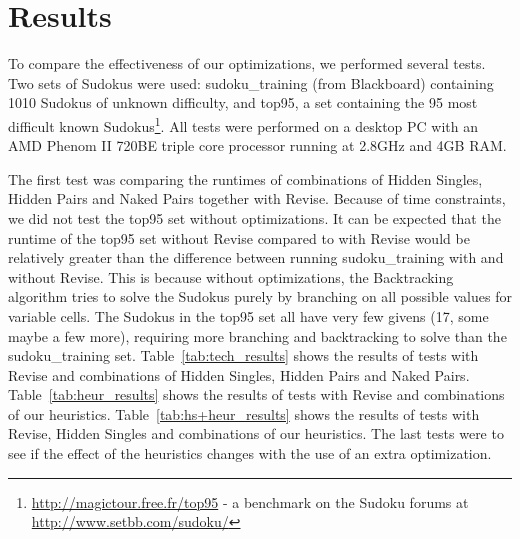 \documentclass[11pt]{article} %
\begin{document}
\section{Results}

To compare the effectiveness of our optimizations, we performed several tests. Two sets of Sudokus were used: sudoku\_training (from Blackboard) containing 1010 Sudokus of unknown difficulty, and top95, a set containing the 95 most difficult known Sudokus\footnote{\url{http://magictour.free.fr/top95} - a benchmark on the Sudoku forums at \url{http://www.setbb.com/sudoku/}}. All tests were performed on a desktop PC with an AMD Phenom II 720BE triple core processor running at 2.8GHz and 4GB RAM.

The first test was comparing the runtimes of combinations of Hidden Singles, Hidden Pairs and Naked Pairs together with Revise. Because of time constraints, we did not test the top95 set without optimizations. It can be expected that the runtime of the top95 set without Revise compared to with Revise would be relatively greater than the difference between running sudoku\_training with and without Revise. This is because without optimizations, the Backtracking algorithm tries to solve the Sudokus purely by branching on all possible values for variable cells. The Sudokus in the top95 set all have very few givens (17, some maybe a few more), requiring more branching and backtracking to solve than the sudoku\_training set.
Table~\ref{tab:tech_results} shows the results of tests with Revise and combinations of Hidden Singles, Hidden Pairs and Naked Pairs. Table~\ref{tab:heur_results} shows the results of tests with Revise and combinations of our heuristics. Table~\ref{tab:hs+heur_results} shows the results of tests with Revise, Hidden Singles and combinations of our heuristics. The last tests were to see if the effect of the heuristics changes with the use of an extra optimization.
\end{document}

